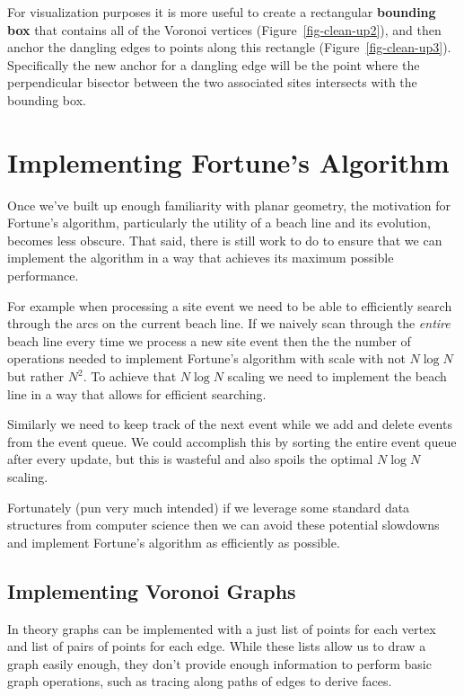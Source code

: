\documentclass[
  letterpaper,
  DIV=11,
  numbers=noendperiod]{scrartcl}
\begin{document}
For visualization purposes it is more useful to create a rectangular
\textbf{bounding box} that contains all of the Voronoi vertices
(Figure~\ref{fig-clean-up2}), and then anchor the dangling edges to
points along this rectangle (Figure~\ref{fig-clean-up3}). Specifically
the new anchor for a dangling edge will be the point where the
perpendicular bisector between the two associated sites intersects with
the bounding box.

\section{Implementing Fortune's Algorithm}\label{sec:implementation}

Once we've built up enough familiarity with planar geometry, the
motivation for Fortune's algorithm, particularly the utility of a beach
line and its evolution, becomes less obscure. That said, there is still
work to do to ensure that we can implement the algorithm in a way that
achieves its maximum possible performance.

For example when processing a site event we need to be able to
efficiently search through the arcs on the current beach line. If we
naively scan through the \emph{entire} beach line every time we process
a new site event then the the number of operations needed to implement
Fortune's algorithm with scale with not \(N \log N\) but rather
\(N^{2}\). To achieve that \(N \log N\) scaling we need to implement the
beach line in a way that allows for efficient searching.

Similarly we need to keep track of the next event while we add and
delete events from the event queue. We could accomplish this by sorting
the entire event queue after every update, but this is wasteful and also
spoils the optimal \(N \log N\) scaling.

Fortunately (pun very much intended) if we leverage some standard data
structures from computer science then we can avoid these potential
slowdowns and implement Fortune's algorithm as efficiently as possible.

\subsection{Implementing Voronoi
Graphs}\label{implementing-voronoi-graphs}

In theory graphs can be implemented with a just list of points for each
vertex and list of pairs of points for each edge. While these lists
allow us to draw a graph easily enough, they don't provide enough
information to perform basic graph operations, such as tracing along
paths of edges to derive faces.
\end{document}
